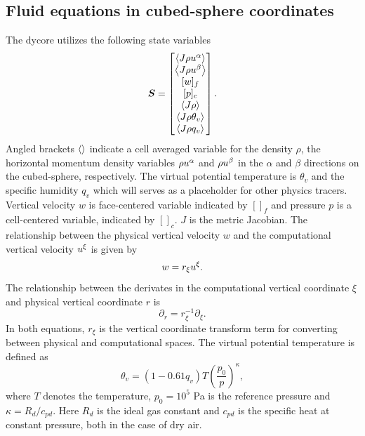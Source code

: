 \subsection{Fluid equations in cubed-sphere coordinates}
The dycore utilizes the following state variables
\begin{equation}
\label{eq:imexsplit}
\boldsymbol{S}
  = 
\begin{bmatrix}
  \left\langle J \rho u^{\alpha} \right\rangle \\
  \left\langle J \rho u^{\beta} \right\rangle \\
  [w]_f \\
  [p]_c \\
  \left\langle J \rho \right\rangle \\
  \left\langle J \rho \theta_v \right\rangle \\
  \left\langle J \rho q_v \right\rangle 
\end{bmatrix}.
\end{equation}
Angled brackets $\left\langle  \right\rangle$ indicate a cell averaged variable for the density $\rho$, the horizontal 
momentum density variables $\rho u^{\alpha}$ and $\rho u^{\beta}$ in the $\alpha$ and
 $\beta$ directions on the cubed-sphere, respectively.
The virtual potential temperature is $\theta_v$ and the 
specific humidity $q_v$ which will serves as a placeholder for other physics tracers. 
Vertical velocity $w$ is face-centered variable indicated by $[]_f$ and 
pressure $p$ is a cell-centered variable, indicated by $[]_c$.
$J$ is the metric Jacobian.
The relationship
between the physical vertical velocity $w$ and the computational vertical velocity $u^{\xi}$ 
is given by
\begin{equation}
w = r_{\xi}u^{\xi}.
\end{equation}
The relationship between the derivates in the computational 
vertical coordinate $\xi$ and physical vertical coordinate $r$
is
\begin{equation}
  \partial_r = r_{\xi}^{-1} \partial_{\xi}.
\end{equation}
In both equations, $r_{\xi}$ is the vertical coordinate transform term for converting
between physical and computational spaces.
The virtual potential temperature is defined as
\begin{equation}
\theta_v = (1-0.61q_v)T\left(\frac{p_0}{p}\right)^\kappa,
\end{equation}
where $T$ denotes the temperature, $p_0=10^5$ Pa is the reference pressure and $\kappa = R_d /c_{pd}$.
Here $R_d$ is the ideal gas constant and $c_{pd}$ is the specific heat at constant 
pressure, both in the case of dry air.

